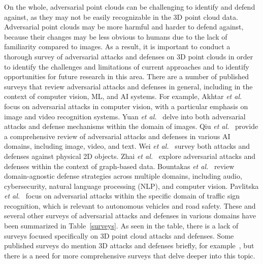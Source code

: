 \documentclass{ieeeaccess}
\def\etal{\textit{et al.}}
\begin{document}
On the whole, adversarial point clouds can be challenging to identify and defend against, as they may not be easily recognizable in the 3D point cloud data. Adversarial point clouds may be more harmful and harder to defend against, because their changes may be less obvious to humans due to the lack of familiarity compared to images. %
As a result, it is important to conduct a thorough survey of adversarial attacks and defenses on 3D point clouds in order to identify the challenges and limitations of current approaches and to identify opportunities for future research in this area.
There are a number of published surveys that review adversarial attacks and defenses in general, including in the context of computer vision, ML, and AI systems. %
For example, Akhtar \etal~\cite{akhtar2018threat} focus on adversarial attacks in computer vision, with a particular emphasis on image and video recognition systems. Yuan \etal~\cite{yuan2019adversarial} delve into both adversarial attacks and defense mechanisms within the domain of images. Qiu \etal~\cite{qiu2019review} provide a comprehensive review of adversarial attacks and defenses in various AI domains, including image, video, and text. Wei \etal~\cite{wei2022physical} survey both attacks and defenses against physical 2D objects. Zhai \etal~\cite{zhai2023state} explore adversarial attacks and defenses within the context of graph-based data. Bountakas \etal~\cite{bountakas2023defense} review domain-agnostic defense strategies across multiple domains, including audio, cybersecurity, natural language processing (NLP), and computer vision. Pavlitska \etal~\cite{pavlitska2023adversarial} focus on adversarial attacks within the specific domain of traffic sign recognition, which is relevant to autonomous vehicles and road safety. These and several other surveys of adversarial attacks and defenses in various domains have been summarized in Table~\ref{surveys}. As seen in the table, there is a lack of surveys focused specifically on 3D point cloud attacks and defenses. Some published surveys do mention 3D attacks and defenses briefly, for example~\cite{akhtar2021advances}, but there is a need for more comprehensive surveys that delve deeper into this topic. 
\end{document}

